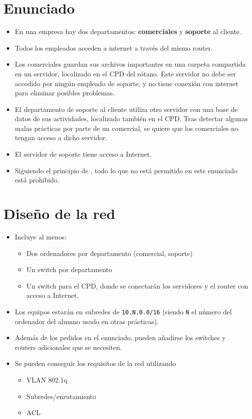 \section{Enunciado}
\begin{itemize}
\item En una empresa hay dos departamentos: \textbf{comerciales} y \textbf{soporte} al cliente.
\item Todos los empleados acceden a internet a través del mismo router.
\item Los comerciales guardan sus archivos importantes en una carpeta compartida en un servidor, localizado en el CPD del sótano. Este servidor no debe ser accedido por ningún empleado de soporte, y no tiene conexión con internet para eliminar posibles problemas.
\item El departamento de soporte al cliente utiliza otro servidor con una base de datos de sus actividades, localizado también en el CPD. Tras detectar algunas malas prácticas por parte de un comercial, se quiere que los comerciales no tengan acceso a dicho servidor.
\item El servidor de soporte tiene acceso a Internet.  
\item Siguiendo el principio de , todo lo que no está permitido en este enunciado está prohibido.
\end{itemize}

\section{Diseño de la red}
\begin{itemize}
\item Incluye al menos:
  \begin{itemize}
  \item Dos ordenadores por departamento (comercial, soporte)
  \item Un switch por departamento
  \item Un switch para el CPD, donde se conectarán los servidores y el router con acceso a Internet.
  \end{itemize}
\item Los equipos estarán en subredes de \texttt{10.N.0.0/16} (siendo \texttt{N} el número del ordenador del alumno usado en otras prácticas).
\item Además de los pedidos en el enunciado, pueden añadirse los switches y routers adicionales que se necesiten.  
\item Se pueden conseguir los requisitos de la red utilizando
  \begin{itemize}
  \item VLAN 802.1q
  \item Subredes/enrutamiento
  \item ACL 
  \end{itemize}
\end{itemize}

